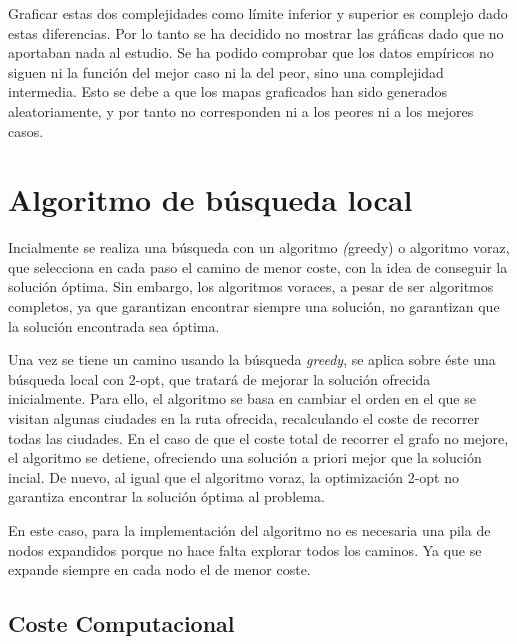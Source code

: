 \documentclass{uc3mpracticas}
\begin{document}
  \vspace{2mm}

  Graficar estas dos complejidades como límite inferior y superior es complejo dado estas diferencias. Por lo tanto se ha decidido no mostrar las gráficas dado que no aportaban nada al estudio. Se ha podido comprobar que los datos empíricos no siguen ni la función del mejor caso ni la del peor, sino una complejidad intermedia. Esto se debe a que los mapas graficados han sido generados aleatoriamente, y por tanto no corresponden ni a los peores ni a los mejores casos.





  \clearpage

  \section{Algoritmo de búsqueda local}

  Incialmente se realiza una búsqueda con un algoritmo \textit(greedy) o algoritmo voraz, que selecciona en cada paso el camino de menor coste, con la idea de conseguir la solución óptima. Sin embargo, los algoritmos voraces, a pesar de ser algoritmos completos, ya que garantizan encontrar siempre una solución, no garantizan que la solución encontrada sea óptima.

  \vspace{2mm}

  Una vez se tiene un camino usando la búsqueda \textit{greedy}, se aplica sobre éste una búsqueda local con 2-opt, que tratará de mejorar la solución ofrecida inicialmente. Para ello, el algoritmo se basa en cambiar el orden en el que se visitan algunas ciudades en la ruta ofrecida, recalculando el coste de recorrer todas las ciudades. En el caso de que el coste total de recorrer el grafo no mejore, el algoritmo se detiene, ofreciendo una solución a priori mejor que la solución incial. De nuevo, al igual que el algoritmo voraz, la optimización 2-opt no garantiza encontrar la solución óptima al problema.

  \vspace{2mm}

  En este caso, para la implementación del algoritmo no es necesaria una pila de nodos expandidos porque no hace falta explorar todos los caminos. Ya que se expande siempre en cada nodo el de menor coste.




  \subsection{Coste Computacional}
\end{document}
